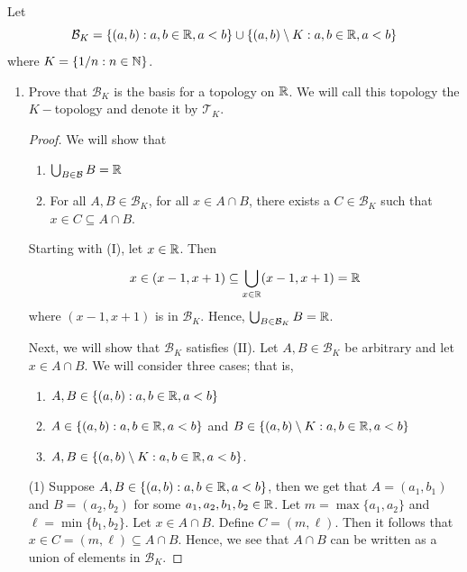 \documentclass[a4paper]{article}
\begin{document}
\vspace{5mm}
\begin{problem}
   Let  
   \[  {\mathcal{B}}_{K} = \{  (a,b) : a,b \in \mathbb{R} , a < b  \}  \cup \{ (a,b) \setminus  K : a,b \in \mathbb{R} , a < b \} \]
   where \( K = \{  1/n : n \in \mathbb{N}  \}  \).
   \begin{enumerate}
       \item[(i)] Prove that \( {\mathcal{B}}_{K } \) is the basis for a topology on \( \mathbb{R}  \). We will call this topology the \( K- \)topology and denote it by \( {\mathcal{T}}_{K} \).
           \begin{proof}
           We will show that 
           \begin{enumerate}
               \item[(I)] \( \bigcup_{ B \in \mathcal{B} }^{  }  B = \mathbb{R}  \)
                \item[(II)] For all \( A,B \in {\mathcal{B}}_{K} \), for all \( x \in A \cap B  \), there exists a \( C \in {\mathcal{B}}_{K} \) such that \( x \in C \subseteq A \cap B  \).

           \end{enumerate}
           Starting with (I), let \( x \in \mathbb{R}  \). Then 
           \[  x \in (x-1, x +1) \subseteq \bigcup_{ x \in \mathbb{R}  }^{  }  (x - 1, x + 1) = \mathbb{R}  \]
           where \( (x -1 , x + 1) \) is in \( \mathcal{B}_K \).
           Hence, \( \bigcup_{ B \in {\mathcal{B}}_{K}  }^{  }  B  = \mathbb{R}  \).

          Next, we will show that \( {\mathcal{B}}_{K} \) satisfies (II). Let \( A,B \in {\mathcal{B}}_{K} \) be arbitrary and let \( x \in A \cap B \). We will consider three cases; that is,  
          \begin{enumerate}
              \item[(1)] \( A, B \in \{ (a,b) : a,b \in \mathbb{R} , a < b  \}  \)
                \item[(2)] \( A \in \{ (a,b) : a,b \in \mathbb{R} , a < b  \}  \) and \( B \in \{ (a,b) \setminus  K  : a,b \in \mathbb{R} , a < b  \}  \)
                \item[(3)] \( A,B \in \{ (a,b) \setminus  K  : a,b \in \mathbb{R} , a < b  \}  \).
          \end{enumerate}
          (1) Suppose \( A,B \in \{ (a,b) : a,b \in \mathbb{R} , a < b \}  \), then we get that \( A = ({a}_{1}, {b}_{1}) \) and \( B = ({a}_{2}, {b}_{2}) \) for some \( {a}_{1}, {a}_{2}, {b}_{1}, {b}_{2} \in \mathbb{R}  \). Let \( m = \max \{ {a}_{1}, {a}_{2} \}  \) and \( \ell = \min \{ {b}_{1}, {b}_{2} \}  \). Let \( x \in A \cap B  \). Define \( C =  (m,\ell)  \). Then it follows that \( x \in C = (m , \ell) \subseteq A \cap B  \). Hence, we see that \( A \cap B  \) can be written as a union of elements in \( {\mathcal{B}}_{K} \).


\end{proof}
\end{enumerate}
\end{problem}
\end{document}
